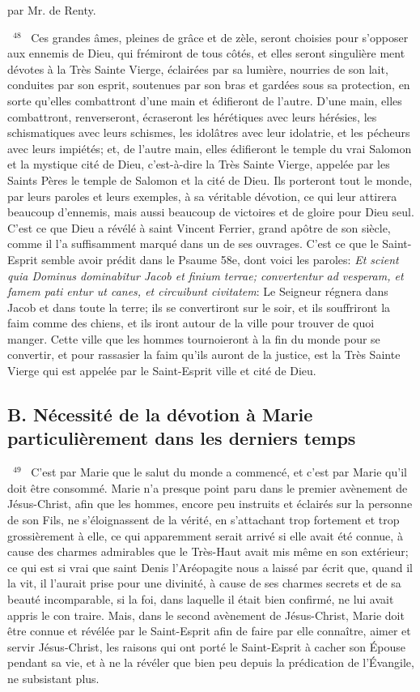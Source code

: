 \documentclass[paper=a5,pagesize=pdftex,fontsize=15pt,headinclude=on,twoside=off]{scrbook}
\newcommand{\negphantom}[1]{\settowidth{\dimen0}{#1}\hspace*{-\dimen0}}
\newcommand{\versenb}[1]{\par \vspace{10pt}~\negphantom{~${}^{#1}$~}${}^{#1}$~}
\newcommand{\latin}[1]{\emph{#1}}
\begin{document}
par Mr. de Renty.
\versenb{48} Ces grandes âmes, pleines de grâce et de zèle, seront choisies pour s'opposer aux ennemis de Dieu, qui
frémiront de tous côtés, et elles seront singulière ment dévotes à la Très Sainte Vierge, éclairées par sa lumière,
nourries de son lait, conduites par son esprit, soutenues par son bras et gardées sous sa protection, en sorte
qu'elles combattront d'une main et édifieront de l'autre. D'une main, elles combattront, renverseront, écraseront les
hérétiques avec leurs hérésies, les schismatiques avec leurs schismes, les idolâtres avec leur idolatrie, et les
pécheurs avec leurs impiétés; et, de l'autre main, elles édifieront le temple du vrai Salomon et la mystique cité de
Dieu, c'est-à-dire la Très Sainte Vierge, appelée par les Saints Pères le temple de Salomon et la cité de Dieu. Ils
porteront tout le monde, par leurs paroles et leurs exemples, à sa véritable dévotion, ce qui leur attirera beaucoup
d'ennemis, mais aussi beaucoup de victoires et de gloire pour Dieu seul. C'est ce que Dieu a révélé à saint Vincent
Ferrier, grand apôtre de son siècle, comme il l'a suffisamment marqué dans un de ses ouvrages.
C'est ce que le Saint-Esprit semble avoir prédit dans le Psaume 58e, dont voici les paroles: \latin{Et scient quia Dominus
dominabitur Jacob et finium terrae; convertentur ad vesperam, et famem pati entur ut canes, et circuibunt
civitatem}: Le Seigneur régnera dans Jacob et dans toute la terre; ils se convertiront sur le soir, et ils souffriront la
faim comme des chiens, et ils iront autour de la ville pour trouver de quoi manger. Cette ville que les hommes
tournoieront à la fin du monde pour se convertir, et pour rassasier la faim qu'ils auront de la justice, est la Très
Sainte Vierge qui est appelée par le Saint-Esprit ville et cité de Dieu.
\subsection{B. Nécessité de la dévotion à Marie particulièrement dans les derniers temps}
\versenb{49} C'est par Marie que le salut du monde a commencé, et c'est par Marie qu'il doit être consommé. Marie n'a
presque point paru dans le premier avènement de Jésus-Christ, afin que les hommes, encore peu instruits et
éclairés sur la personne de son Fils, ne s'éloignassent de la vérité, en s'attachant trop fortement et trop
grossièrement à elle, ce qui apparemment serait arrivé si elle avait été connue, à cause des charmes admirables
que le Très-Haut avait mis même en son extérieur; ce qui est si vrai que saint Denis l'Aréopagite nous a laissé par
écrit que, quand il la vit, il l'aurait prise pour une divinité, à cause de ses charmes secrets et de sa beauté
incomparable, si la foi, dans laquelle il était bien confirmé, ne lui avait appris le con traire. Mais, dans le second
avènement de Jésus-Christ, Marie doit être connue et révélée par le Saint-Esprit afin de faire par elle connaître,
aimer et servir Jésus-Christ, les raisons qui ont porté le Saint-Esprit à cacher son Épouse pendant sa vie, et à ne
la révéler que bien peu depuis la prédication de l'Évangile, ne subsistant plus.
\end{document}
